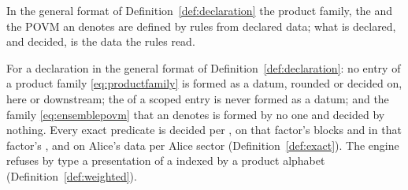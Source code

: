 
In the general format of Definition~\ref{def:declaration} the product
family, the  and the POVM an
 denotes are defined by rules from declared data; what is
declared, and decided, is the data the rules read.

\begin{requirement}\label{req:derived-objects}
For a declaration in the general format of
Definition~\ref{def:declaration}: no entry of a product family
\eqref{eq:productfamily} is formed as a datum, rounded or decided on, here or
downstream; the  of a scoped entry is never formed as a
datum; and the family \eqref{eq:ensemblepovm} that an 
denotes is formed by no one and decided by nothing. Every exact predicate is
decided per , on that factor's blocks and in that
factor's , and on Alice's data per Alice sector
(Definition~\ref{def:exact}). The engine refuses by type a presentation of a
 indexed by a product alphabet
(Definition~\ref{def:weighted}).
\end{requirement}
